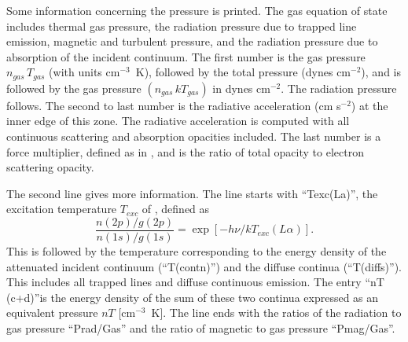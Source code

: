 Some information concerning the pressure is printed.
The gas equation
of state includes thermal gas pressure, the radiation pressure due to trapped
line emission, magnetic and turbulent pressure, and the radiation pressure
due to absorption of the incident continuum.
The first number is the gas
pressure $n_{gas}\, T_{gas}$ (with units cm$^{-3}$~K), followed by the total pressure
(dynes cm$^{-2}$), and is followed by the gas pressure
$(n_{gas}\, kT_{gas})$ in dynes cm$^{-2}$.
The radiation pressure follows.  The second to last number is the
radiative acceleration (cm s$^{-2}$) at the inner edge of this zone.
The
radiative acceleration is computed with all continuous scattering and
absorption opacities included.  The last number is a force multiplier,
defined as in \citet{Tarter1973}, and is the ratio of total opacity
to electron scattering opacity.

The second line gives more information.
The line starts with
``Texc(La)'', the excitation temperature $T_{exc}$ of \la,
defined as
\begin{equation}
\frac{{n\left( {2p} \right)/g\left( {2p} \right)}}{{n\left( {1s}
\right)/g\left( {1s} \right)}} = \exp \left[ { - h\nu /k{T_{exc}}\left(
{L\alpha } \right)} \right].%
\end{equation}
This is followed by the temperature corresponding to the energy density
of the attenuated incident continuum (``T(contn)'')
and the diffuse continua (``T(diffs)'').
This includes all trapped lines and diffuse continuous
emission.
The entry ``nT (c+d)''is the energy density of the sum of these
two continua expressed as an equivalent pressure $nT$ [cm$^{-3}$~K].
The line
ends with the ratios of the radiation to gas pressure ``Prad/Gas'' and the
ratio of magnetic to gas pressure ``Pmag/Gas''.

